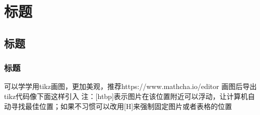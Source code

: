 \chapter{\textbf{标题}}%
\section[\textnormal{标题}]{\textbf{标题}}

\subsection[\textnormal{标题}]{\textbf{标题}}

可以学学用tikz画图，更加美观，推荐https://www.mathcha.io/editor 画图后导出tikz代码像下面这样引入
注：[htbp]表示图片在该位置附近可以浮动，让计算机自动寻找最佳位置；如果不习惯可以改用[H]来强制固定图片或者表格的位置
